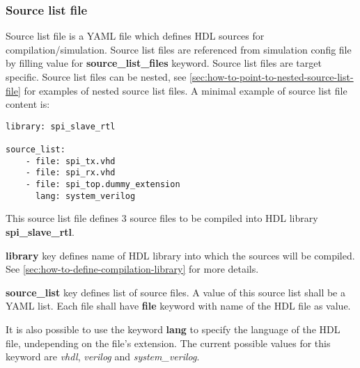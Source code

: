 \documentclass{tropic_design_spec}
\begin{document}


\subsubsection{Source list file}
\label{sec:source-list-file}

Source list file is a YAML file which defines HDL sources for compilation/simulation.
Source list files are referenced from simulation config file by filling value for
\textbf{source_list_files} keyword. Source list files are target specific. Source list
files can be nested, see \ref{sec:how-to-point-to-nested-source-list-file} for examples
of nested source list files. A minimal example of source list file content is:

\begin{lstlisting}
library: spi_slave_rtl

source_list:
    - file: spi_tx.vhd
    - file: spi_rx.vhd
    - file: spi_top.dummy_extension
      lang: system_verilog
\end{lstlisting}

This source list file defines 3 source files to be compiled into HDL library
\textbf{spi_slave_rtl}.

\textbf{library} key defines name of HDL library into which the sources will be compiled.
                 See \ref{sec:how-to-define-compilation-library} for more details.

\textbf{source_list} key defines list of source files. A value of this source list
    shall be a YAML list. Each file shall have \textbf{file} keyword with name of
    the HDL file as value.

It is also possible to use the keyword \textbf{lang} to specify the language of the
HDL file, undepending on the file's extension. The current possible values for this
keyword are \textit{vhdl}, \textit{verilog} and \textit{system_verilog}.

\end{document}
